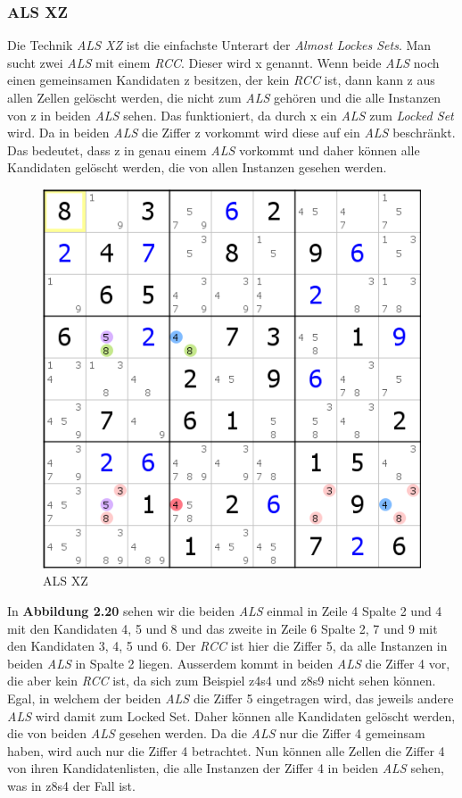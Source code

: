 \newpage
\subsubsection{ALS XZ}
Die Technik \textit{ALS XZ} ist die einfachste Unterart der \textit{Almost Lockes Sets}. Man sucht zwei \textit{ALS} mit einem \textit{RCC}. Dieser wird x genannt. Wenn beide \textit{ALS} noch einen gemeinsamen Kandidaten z besitzen, der kein \textit{RCC} ist, dann kann z aus allen Zellen gelöscht werden, die nicht zum \textit{ALS} gehören und die alle Instanzen von z in beiden \textit{ALS} sehen. Das funktioniert, da durch x ein \textit{ALS} zum \textit{Locked Set} wird. Da in beiden \textit{ALS} die Ziffer z vorkommt wird diese auf ein \textit{ALS} beschränkt. Das bedeutet, dass z in genau einem \textit{ALS} vorkommt und daher können alle Kandidaten gelöscht werden, die von allen Instanzen gesehen werden.

\begin{figure}[h]
\begin{center}
\includegraphics{./img/ALS_XZ.png}
\caption{ALS XZ}
\end{center}
\end{figure}

\noindent In \textbf{Abbildung 2.20} sehen wir die beiden \textit{ALS} einmal in Zeile 4 Spalte 2 und 4 mit den Kandidaten 4, 5 und 8 und das zweite in Zeile 6 Spalte 2, 7 und 9 mit den Kandidaten 3, 4, 5 und 6. Der \textit{RCC} ist hier die Ziffer 5, da alle Instanzen in beiden \textit{ALS} in Spalte 2 liegen. Ausserdem kommt in beiden \textit{ALS} die Ziffer 4 vor, die aber kein \textit{RCC} ist, da sich zum Beispiel z4s4 und z8s9 nicht sehen können. Egal, in welchem der beiden \textit{ALS} die Ziffer 5 eingetragen wird, das jeweils andere \textit{ALS} wird damit zum Locked Set. Daher können alle Kandidaten gelöscht werden, die von beiden \textit{ALS} gesehen werden. Da die \textit{ALS} nur die Ziffer 4 gemeinsam haben, wird auch nur die Ziffer 4 betrachtet. Nun können alle Zellen die Ziffer 4 von ihren Kandidatenlisten, die alle Instanzen der Ziffer 4 in beiden \textit{ALS} sehen, was in z8s4 der Fall ist.